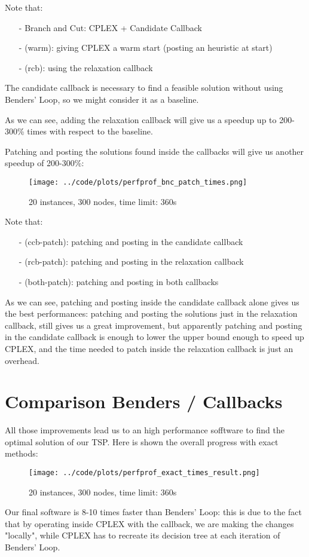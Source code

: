 Note that:
\begin{itemize}
    \item[-] Branch and Cut: CPLEX + Candidate Callback
    \item[-] (warm): giving CPLEX a warm start (posting an heuristic at start)
    \item[-] (rcb): using the relaxation callback
\end{itemize}

The candidate callback is necessary to find a feasible solution without using Benders' Loop, so we might consider it as a baseline.

As we can see, adding the relaxation callback will give us a speedup up to 200-300\% times with respect to the baseline.

Patching and posting the solutions found inside the callbacks will give us another speedup of 200-300\%:

\FloatBarrier
\begin{figure}[h]
    \centering
    \texttt{[image: ../code/plots/perfprof\_bnc\_patch\_times.png]}
    \caption*{20 instances, 300 nodes, time limit: 360s}
\end{figure}
\FloatBarrier

Note that:
\begin{itemize}
    \item[-] (ccb-patch): patching and posting in the candidate callback
    \item[-] (rcb-patch): patching and posting in the relaxation callback
    \item[-] (both-patch): patching and posting in both callbacks
\end{itemize}

As we can see, patching and posting inside the candidate callback alone gives us the best performances: patching and posting the solutions just in the relaxation callback, still gives us a great improvement, but apparently patching and posting in the candidate callback is enough to lower the upper bound enough to speed up CPLEX, and the time needed to patch inside the relaxation callback is just an overhead.

\newpage

\section{Comparison Benders / Callbacks}
All those improvements lead us to an high performance sofftware to find the optimal solution of our TSP. Here is shown the overall progress with exact methods:

\FloatBarrier
\begin{figure}[h]
    \centering
    \texttt{[image: ../code/plots/perfprof\_exact\_times\_result.png]}
    \caption*{20 instances, 300 nodes, time limit: 360s}
\end{figure}
\FloatBarrier

Our final software is 8-10 times faster than Benders' Loop: this is due to the fact that by operating inside CPLEX with the callback, we are making the changes "locally", while CPLEX has to recreate its decision tree at each iteration of Benders' Loop.